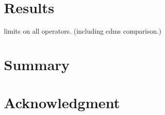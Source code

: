 \section{Results}

limits on all operators. (including cdms comparison.)

\section{Summary}
\section{Acknowledgment}

